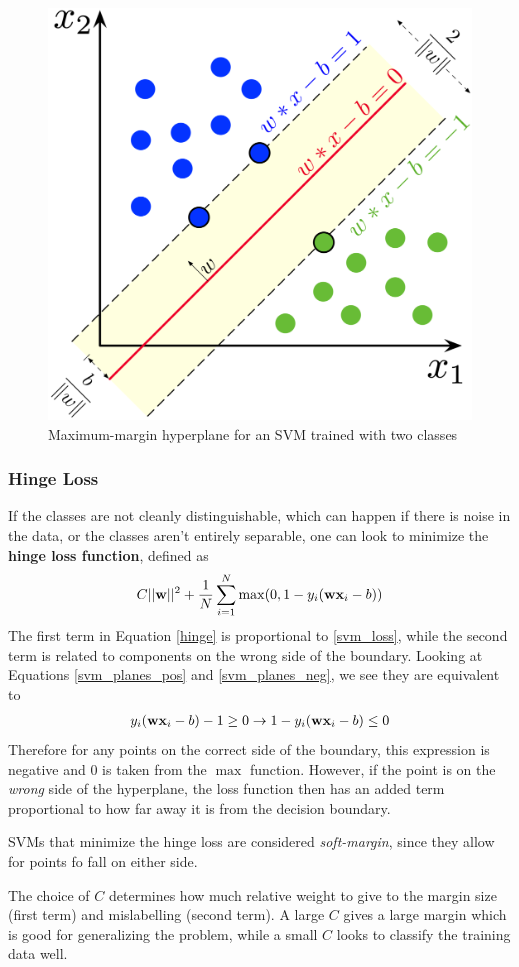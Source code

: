 \begin{figure}
\centerline{\includegraphics[width=0.5\linewidth]{mathematics/fig/svm.png}}
\caption{Maximum-margin hyperplane for an SVM trained with two classes \cite{wiki_svm}}
\label{fig:svm}
\end{figure}

\subsubsection{Hinge Loss}

If the classes are not cleanly distinguishable, which can happen if there is noise in the data, or the classes aren't entirely separable, one can look to minimize the \textbf{hinge loss function}, defined as
\begin{align}\label{hinge}
	C||\textbf{w}||^2 + \frac{1}{N}\sum_{i=1}^N \max(0,1-y_i(\textbf{wx}_i-b))
\end{align}
The first term in Equation \ref{hinge} is proportional to \ref{svm_loss}, while the second term is related to components on the wrong side of the boundary. Looking at Equations \ref{svm_planes_pos} and \ref{svm_planes_neg}, we see they are equivalent to 
\begin{align}
	y_i(\textbf{wx}_i-b) -1\ge 0\rightarrow 1- y_i(\textbf{wx}_i-b) \le 0
\end{align}
Therefore for any points on the correct side of the boundary, this expression is negative and $0$ is taken from the $\max$ function. However, if the point is on the \emph{wrong} side of the hyperplane, the loss function then has an added term proportional to how far away it is from the decision boundary.

SVMs that minimize the hinge loss are considered \emph{soft-margin}, since they allow for points fo fall on either side.

The choice of $C$ determines how much relative weight to give to the margin size (first term) and mislabelling (second term). A large $C$ gives a large margin which is good for generalizing the problem, while a small $C$  looks to classify the training data well.

